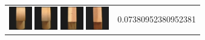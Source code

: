 \begin{figure}[bp]
\begin{tabular}{m{11cm} | m{3cm} |}
\includegraphics[width=1cm]{coil/beeld-5.eps}
\includegraphics[width=1cm]{coil/beeld-2.eps}
\includegraphics[width=1cm]{coil/beeld-47.eps}
\includegraphics[width=1cm]{coil/beeld-44.eps}
& {\scriptsize 0.07380952380952381}
\\
\end{tabular}
\vspace{5pt}
\end{figure}

